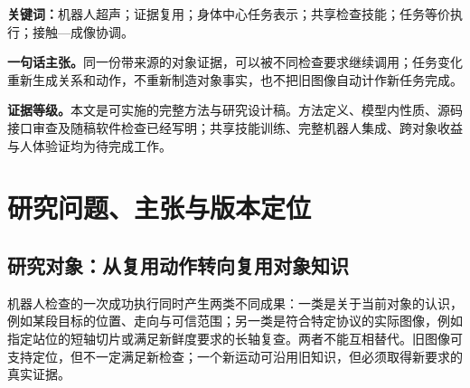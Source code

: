 \documentclass[UTF8,11pt,a4paper,fontset=fandol]{ctexart}
\numberwithin{equation}{section}
\theoremstyle{definition}
\begin{document}
\begin{abstract}
机器人检查中获得的对象知识往往被绑定到获取它时的视角、任务步骤和执行轨迹：短轴扫描积累的目标认识，未必能直接服务后续长轴检查；对象姿态改变后，已有观测与机器人路径又可能同时失效。本文提出 Anatomical GPS V8.2，围绕\emph{证据复用驱动的技能复用}组织身体中心表示、任务关系与实际执行。方法把对象知识、检查要求和完成记录分开，并定义三个具有明确读写边界的操作：Update 将按采集位姿、时间与关联解释的唯一观测写入对象状态；Query 从同一状态生成不同检查任务的成像关系、不确定性、未完成区段与允许实现族，而不改写对象事实；Realize 将共享策略的任务动作偏好转化为 dIRD 引导的连续实现与接触—成像联合控制。历史图像可以改善新任务的目标认识，却只有满足该任务的方向、质量和新鲜度要求时才计为完成。方法继承 V3.1 的任务关系表示、V6.1 的任务等价执行及 V3.2 的带适用条件记忆更新，以 Genesis 生成的受控场景训练同信息教师蒸馏策略，以真实超声更新当前对象。本文给出可实现的观测与查询模型、带来源和版本的证据账本、跨姿态复用协议、完整外层 QP、条件性性质及证明、强基线与组合留出实验设计。新增贡献定位为一个可以更新、查询并重新执行的对象证据接口及其系统能力，而非调和坐标、滤波、运动基元或 QP 的首次提出。随稿报告实际运行的局部代数与接口检查，不填入尚未开展的学习、Genesis 闭环或真实机器人性能。
\end{abstract}
\noindent\textbf{关键词：}机器人超声；证据复用；身体中心任务表示；共享检查技能；任务等价执行；接触—成像协调。

\begin{keybox}
\textbf{一句话主张。}同一份带来源的对象证据，可以被不同检查要求继续调用；任务变化重新生成关系和动作，不重新制造对象事实，也不把旧图像自动计作新任务完成。
\medskip\par
\textbf{证据等级。}本文是可实施的完整方法与研究设计稿。方法定义、模型内性质、源码接口审查及随稿软件检查已经写明；共享技能训练、完整机器人集成、跨对象收益与人体验证均为待完成工作。
\end{keybox}
\tableofcontents
\clearpage

\section{研究问题、主张与版本定位}
\label{sec:intro}
\subsection{研究对象：从复用动作转向复用对象知识}
机器人检查的一次成功执行同时产生两类不同成果：一类是关于当前对象的认识，例如某段目标的位置、走向与可信范围；另一类是符合特定协议的实际图像，例如指定站位的短轴切片或满足新鲜度要求的长轴复查。两者不能互相替代。旧图像可支持定位，但不一定满足新检查；一个新运动可沿用旧知识，但必须取得新要求的真实证据。
\end{document}
